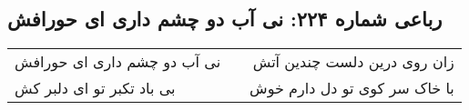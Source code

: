 \begin{center}
\section*{رباعی شماره ۲۲۴: نی آب دو چشم داری ای حورافش}
\label{sec:sh224}
\begin{longtable}{l p{0.5cm} r}
نی آب دو چشم داری ای حورافش
&&
زان روی درین دلست چندین آتش
\\
بی باد تکبر تو ای دلبر کش
&&
با خاک سر کوی تو دل دارم خوش
\\
\end{longtable}
\end{center}
